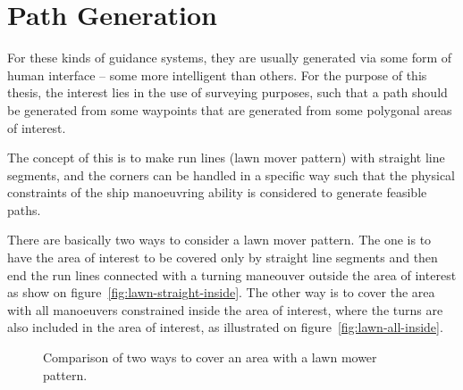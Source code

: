 \chapter{Path Generation}
\label{ch:pathgen}

For these kinds of guidance systems, they are usually generated via some
form of human interface -- some more intelligent than others. For the
purpose of this thesis, the interest lies in the use of surveying
purposes, such that a path should be generated from some waypoints
that are generated from some polygonal areas of interest.

The concept of this is to make run lines (lawn mover pattern) with
straight line segments, and the corners can be handled in a specific
way such that the physical constraints of the ship manoeuvring ability
is considered to generate feasible paths.

There are basically two ways to consider a lawn mover pattern. The
one is to have the area of interest to be covered only by straight line
segments and then end the run lines connected with a turning maneouver outside the
area of interest as show on figure~\vref{fig:lawn-straight-inside}. The other way is to cover the area with all manoeuvers constrained inside the area of interest, where the turns are also included in the area of interest, as illustrated on figure~\vref{fig:lawn-all-inside}.

\begin{figure}[htbp]
	\centering
	\qquad
	\caption{Comparison of two ways to cover an area with a lawn mower
	pattern.}
\end{figure}


